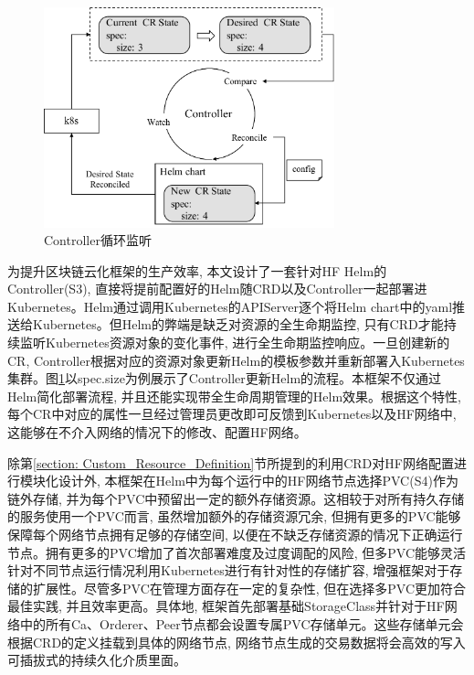 \begin{figure}[h] %
    \centering %
    \includegraphics[width=0.75\textwidth]{FIGs/chapter5/controller.pdf} %
    \caption{Controller循环监听} %
    \label{controller} %
\end{figure}%

为提升区块链云化框架的生产效率, 本文设计了一套针对HF Helm的Controller(S3), 直接将提前配置好的Helm随CRD以及Controller一起部署进Kubernetes。Helm通过调用Kubernetes的APIServer逐个将Helm chart中的yaml推送给Kubernetes。但Helm的弊端是缺乏对资源的全生命期监控, 只有CRD才能持续监听Kubernetes资源对象的变化事件, 进行全生命期监控响应。一旦创建新的CR, Controller根据对应的资源对象更新Helm的模板参数并重新部署入Kubernetes集群。图\ref{controller}以spec.size为例展示了Controller更新Helm的流程。本框架不仅通过Helm简化部署流程, 并且还能实现带全生命周期管理的Helm效果。根据这个特性, 每个CR中对应的属性一旦经过管理员更改即可反馈到Kubernetes以及HF网络中, 这能够在不介入网络的情况下的修改、配置HF网络。


除第\ref{section: Custom_Resource_Definition}节所提到的利用CRD对HF网络配置进行模块化设计外, 本框架在Helm中为每个运行中的HF网络节点选择PVC(S4)作为链外存储, 并为每个PVC中预留出一定的额外存储资源。这相较于对所有持久存储的服务使用一个PVC而言, 虽然增加额外的存储资源冗余, 但拥有更多的PVC能够保障每个网络节点拥有足够的存储空间, 以便在不缺乏存储资源的情况下正确运行节点。拥有更多的PVC增加了首次部署难度及过度调配的风险, 但多PVC能够灵活针对不同节点运行情况利用Kubernetes进行有针对性的存储扩容, 增强框架对于存储的扩展性。尽管多PVC在管理方面存在一定的复杂性, 但在选择多PVC更加符合最佳实践, 并且效率更高\cite{d2020design}。具体地, 框架首先部署基础StorageClass并针对于HF网络中的所有Ca、Orderer、Peer节点都会设置专属PVC存储单元。这些存储单元会根据CRD的定义挂载到具体的网络节点, 网络节点生成的交易数据将会高效的写入可插拔式的持续久化介质里面。

